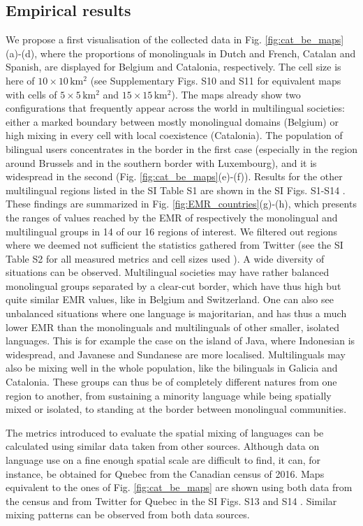 \documentclass[../thesis.tex]{subfiles}
\begin{document}
\subsection{Empirical results}
We propose a first visualisation of the collected data in Fig.
\ref{fig:cat_be_maps}(a)-(d), where the proportions of
monolinguals in Dutch and French, Catalan and Spanish, are displayed for Belgium and
Catalonia, respectively. The cell size is here of $10 \times 10 \, \si{\kilo \meter
\squared}$ (see Supplementary Figs. S10 and S11 \cite{supp} for equivalent maps with
cells of $5 \times 5 \, \si{\kilo \meter \squared}$ and $15 \times 15 \, \si{\kilo
\meter \squared}$). The maps already show two configurations that frequently appear
across the world in multilingual societies: either a marked boundary between mostly
monolingual domains (Belgium) or high mixing in every cell with local coexistence
(Catalonia). The population of bilingual users concentrates in the border in the first
case (especially in the region around Brussels and in the southern border with
Luxembourg), and it is widespread in the second (Fig.
\ref{fig:cat_be_maps}(e)-(f)). Results for the other
multilingual regions listed in the SI Table S1 are shown in the SI Figs. S1-S14
\cite{supp}. These findings are summarized in Fig.
\ref{fig:EMR_countries}(g)-(h), which presents the ranges of
values reached by the EMR of respectively the monolingual and multilingual groups in 14
of our 16 regions of interest. We filtered out regions where we deemed not sufficient
the statistics gathered from Twitter (see the SI Table S2 for all measured metrics and
cell sizes used \cite{supp}). A wide diversity of situations can be observed.
Multilingual societies may have rather balanced monolingual groups separated by a
clear-cut border, which have thus high but quite similar EMR values, like in Belgium and
Switzerland. One can also see unbalanced situations where one language is majoritarian,
and has thus a much lower EMR than the monolinguals and multilinguals of other smaller,
isolated languages. This is for example the case on the island of Java, where Indonesian
is widespread, and Javanese and Sundanese are more localised. Multilinguals may also be
mixing well in the whole population, like the bilinguals in Galicia and Catalonia. These
groups can thus be of completely different natures from one region to another, from
sustaining a minority language while being spatially mixed or isolated, to standing at
the border between monolingual communities.

The metrics introduced to evaluate the spatial mixing of languages can be calculated
using similar data taken from other sources. Although data on language use on a fine
enough spatial scale are difficult to find, it can, for instance, be obtained for Quebec
from the Canadian census of 2016. Maps equivalent to the ones of Fig.
\ref{fig:cat_be_maps} are shown using both data from the census and from
Twitter for Quebec in the SI Figs. S13 and S14 \cite{supp}. Similar mixing patterns can
be observed from both data sources.
\end{document}
